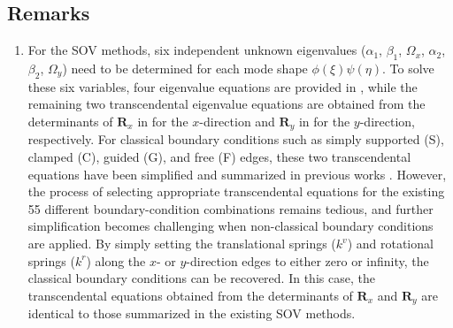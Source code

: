 \documentclass[preprint,12pt,number]{elsarticle}
\begin{document}
\subsection{Remarks}
\begin{enumerate}[label=(\roman*)]
	\item For the SOV methods, six independent unknown eigenvalues ($\alpha_1$, $\beta_1$, $\Omega_x$, $\alpha_2$, $\beta_2$, $\Omega_y$) need to be determined for each mode shape $\phi(\xi)\psi(\eta)$.  
	To solve these six variables, four eigenvalue equations are provided in , while the remaining two transcendental eigenvalue equations are obtained from the determinants of $\mathbf{R}_x$ in  for the $x$-direction and $\mathbf{R}_y$ in  for the $y$-direction, respectively.
	For classical boundary conditions such as simply supported (S), clamped (C), guided (G), and free (F) edges, these two transcendental equations have been simplified and summarized in previous works \citep{xing2020extended,xing2020improved,xing2022review}.  
	However, the process of selecting appropriate transcendental equations for the existing 55 different boundary-condition combinations remains tedious, and further simplification becomes challenging when non-classical boundary conditions are applied.
	By simply setting the translational springs ($k^v$) and rotational springs ($k^r$) along the $x$- or $y$-direction edges to either zero or infinity, the classical boundary conditions can be recovered.  
	In this case, the transcendental equations obtained from the determinants of $\mathbf{R}_x$ and $\mathbf{R}_y$ are identical to those summarized in the existing SOV methods.
	

\end{enumerate}
\end{document}
